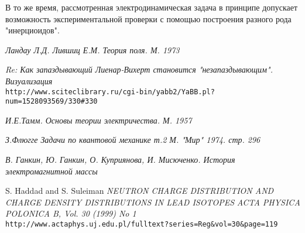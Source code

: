 \documentclass{article}
\begin{document}
В то же время, рассмотренная электродинамическая задача в принципе допускает возможность экспериментальной проверки с помощью построения разного рода "инерциоидов".


\begin{thebibliography}{99}

\textit{Ландау Л.Д. Лившиц Е.М. Теория поля. М. 1973}

\textit{Re: Как запаздывающий Лиенар-Вихерт становится "незапаздывающим". Визуализация}
\\\texttt{http://www.sciteclibrary.ru/cgi-bin/yabb2/YaBB.pl?num=1528093569/330\#330}

\textit{И.Е.Тамм. Основы теории электричества. М. 1957}

\textit{З.Флюгге Задачи по квантовой механике т.2 М. "Мир" 1974. стр. 296}

\textit{В. Ганкин, Ю. Ганкин, О. Куприянова, И. Мисюченко. История электромагнитной массы}


S. Haddad and S. Suleiman
\textit{NEUTRON CHARGE DISTRIBUTION AND CHARGE DENSITY DISTRIBUTIONS IN LEAD ISOTOPES}
\textit{ACTA PHYSICA POLONICA B, Vol. 30 (1999) No 1}
\\\texttt{http://www.actaphys.uj.edu.pl/fulltext?series=Reg\&vol=30\&page=119}



\end{thebibliography}
\end{document}
